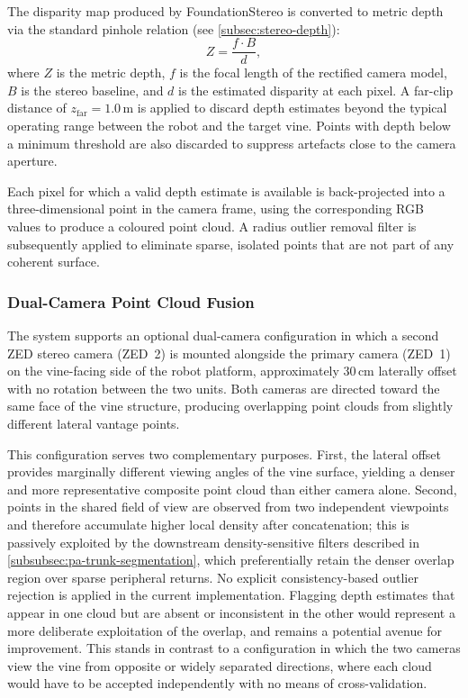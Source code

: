 The disparity map produced by FoundationStereo is converted to metric depth via the standard pinhole relation (see \cref{subsec:stereo-depth}):
%
\begin{equation}
    Z = \frac{f \cdot B}{d},
\end{equation}
%
where $Z$ is the metric depth, $f$ is the focal length of the rectified camera model, $B$ is the stereo baseline, and $d$ is the estimated disparity at each pixel. A far-clip distance of $z_\mathrm{far} = 1.0$\,m is applied to discard depth estimates beyond the typical operating range between the robot and the target vine.
Points with depth below a minimum threshold are also discarded to suppress artefacts close to the camera aperture.

Each pixel for which a valid depth estimate is available is back-projected into a three-dimensional point in the camera frame, using the corresponding RGB values to produce a coloured point cloud. A radius outlier removal filter is subsequently applied to eliminate sparse, isolated points that are not part of any coherent surface.

\subsubsection{Dual-Camera Point Cloud Fusion}
\label{subsubsec:pa-dual-camera}

The system supports an optional dual-camera configuration in which a second ZED stereo camera (ZED~2) is mounted alongside the primary camera (ZED~1) on the vine-facing side of the robot platform, approximately 30\,cm laterally offset with no rotation between the two units. Both cameras are directed toward the same face of the vine structure, producing overlapping point clouds from slightly different lateral vantage points.

This configuration serves two complementary purposes. First, the lateral offset provides marginally different viewing angles of the vine surface, yielding a denser and more representative composite point cloud than either camera alone. Second, points in the shared field of view are observed from two independent viewpoints and therefore accumulate higher local density after concatenation; this is passively exploited by the downstream density-sensitive filters described in \cref{subsubsec:pa-trunk-segmentation}, which preferentially retain the denser overlap region over sparse peripheral returns. No explicit consistency-based outlier rejection is applied in the current implementation. Flagging depth estimates that appear in one cloud but are absent or inconsistent in the other would represent a more deliberate exploitation of the overlap, and remains a potential avenue for improvement. This stands in contrast to a configuration in which the two cameras view the vine from opposite or widely separated directions, where each cloud would have to be accepted independently with no means of cross-validation.

